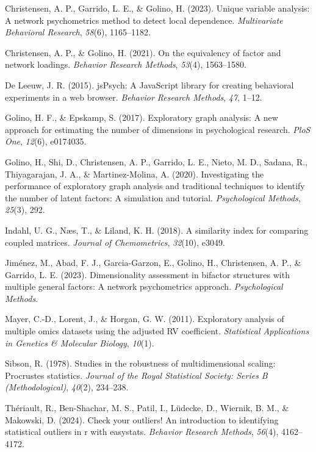 \documentclass[
  jou,
  floatsintext,
  longtable,
  nolmodern,
  notxfonts,
  notimes,
  colorlinks=true,linkcolor=blue,citecolor=blue,urlcolor=blue]{apa7}
\newlength{\cslhangindent}
\newenvironment{CSLReferences}[2] %
 {\begin{list}{}{%
  \setlength{\itemindent}{0pt}
  \setlength{\leftmargin}{0pt}
  \setlength{\parsep}{0pt}
  \ifodd #1
   \setlength{\leftmargin}{\cslhangindent}
   \setlength{\itemindent}{-1\cslhangindent}
  \fi
  \setlength{\itemsep}{#2\baselineskip}}}
 {\end{list}}
\begin{document}
\label{refs}
\begin{CSLReferences}{1}{0}
Christensen, A. P., Garrido, L. E., \& Golino, H. (2023). Unique
variable analysis: A network psychometrics method to detect local
dependence. \emph{Multivariate Behavioral Research}, \emph{58}(6),
1165--1182.

Christensen, A. P., \& Golino, H. (2021). On the equivalency of factor
and network loadings. \emph{Behavior Research Methods}, \emph{53}(4),
1563--1580.

De Leeuw, J. R. (2015). jsPsych: A JavaScript library for creating
behavioral experiments in a web browser. \emph{Behavior Research
Methods}, \emph{47}, 1--12.

Golino, H. F., \& Epskamp, S. (2017). Exploratory graph analysis: A new
approach for estimating the number of dimensions in psychological
research. \emph{PloS One}, \emph{12}(6), e0174035.

Golino, H., Shi, D., Christensen, A. P., Garrido, L. E., Nieto, M. D.,
Sadana, R., Thiyagarajan, J. A., \& Martinez-Molina, A. (2020).
Investigating the performance of exploratory graph analysis and
traditional techniques to identify the number of latent factors: A
simulation and tutorial. \emph{Psychological Methods}, \emph{25}(3),
292.

Indahl, U. G., Næs, T., \& Liland, K. H. (2018). A similarity index for
comparing coupled matrices. \emph{Journal of Chemometrics},
\emph{32}(10), e3049.

Jiménez, M., Abad, F. J., Garcia-Garzon, E., Golino, H., Christensen, A.
P., \& Garrido, L. E. (2023). Dimensionality assessment in bifactor
structures with multiple general factors: A network psychometrics
approach. \emph{Psychological Methods}.

Mayer, C.-D., Lorent, J., \& Horgan, G. W. (2011). Exploratory analysis
of multiple omics datasets using the adjusted RV coefficient.
\emph{Statistical Applications in Genetics \& Molecular Biology},
\emph{10}(1).

Sibson, R. (1978). Studies in the robustness of multidimensional
scaling: Procrustes statistics. \emph{Journal of the Royal Statistical
Society: Series B (Methodological)}, \emph{40}(2), 234--238.

Thériault, R., Ben-Shachar, M. S., Patil, I., Lüdecke, D., Wiernik, B.
M., \& Makowski, D. (2024). Check your outliers! An introduction to
identifying statistical outliers in r with easystats. \emph{Behavior
Research Methods}, \emph{56}(4), 4162--4172.

\end{CSLReferences}
\end{document}
